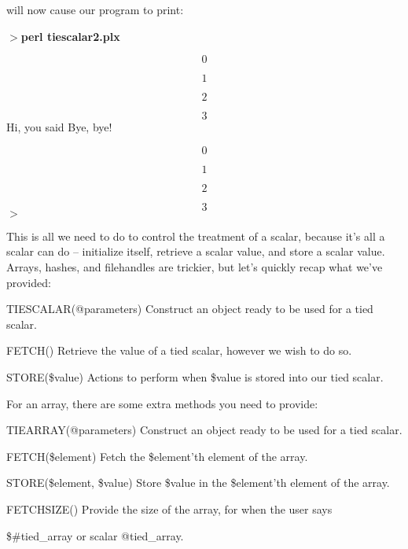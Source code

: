 \documentclass[a4paper,11pt]{book}
\begin{document}
\noindent 

\noindent will now cause our program to print:

\noindent 

\noindent $>$\textbf{perl tiescalar2.plx}

\[0\] 

\[1\] 

\[2\] 

\[3\] 
Hi, you said Bye, bye!

\[0\] 

\[1\] 

\[2\] 

\[3\] 
$>$

\noindent 

\noindent This is all we need to do to control the treatment of a scalar, because it's all a scalar can do -- initialize itself, retrieve a scalar value, and store a scalar value. Arrays, hashes, and filehandles are trickier, but let's quickly recap what we've provided:

\noindent 

\noindent TIESCALAR(@parameters) Construct an object ready to be used for a tied scalar.

\noindent 

\noindent FETCH() Retrieve the value of a tied scalar, however we wish to do so.

\noindent 

\noindent STORE(\$value) Actions to perform when \$value is stored into our tied scalar.

\noindent 

\noindent 

\noindent For an array, there are some extra methods you need to provide:

\noindent 

\noindent TIEARRAY(@parameters) Construct an object ready to be used for a tied scalar.

\noindent 

\noindent FETCH(\$element) Fetch the \$element'th element of the array.

\noindent 

\noindent STORE(\$element, \$value) Store \$value in the \$element'th element of the array.

\noindent 

\noindent FETCHSIZE() Provide the size of the array, for when the user says

\noindent \$\#tied\_array or scalar @tied\_array.

\noindent 
\end{document}
